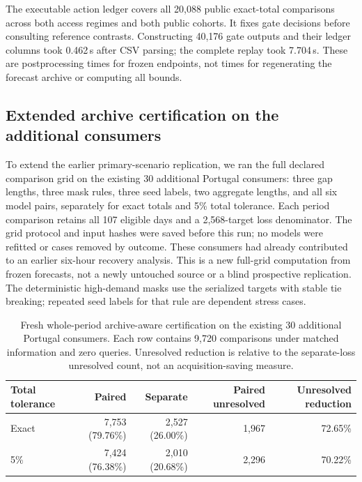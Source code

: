 The executable action ledger covers all 20,088 public exact-total comparisons
across both access regimes and both public cohorts. It fixes gate decisions
before consulting reference contrasts. Constructing 40,176 gate outputs and
their ledger columns took 0.462\,s after CSV parsing; the complete replay took
7.704\,s. These are postprocessing times for frozen endpoints, not times for
regenerating the forecast archive or computing all bounds.

\subsection{Extended archive certification on the additional consumers}
\label{sec:extended_archive_replication}
To extend the earlier primary-scenario replication, we ran the full declared
comparison grid on the existing 30 additional Portugal consumers: three gap
lengths, three mask rules, three seed labels, two aggregate lengths, and all
six model pairs, separately for exact totals and 5\% total tolerance.
Each period comparison retains all 107 eligible days and a 2,568-target loss
denominator. The grid protocol and input hashes were saved before this run;
no models were refitted or cases removed by outcome. These consumers had
already contributed to an earlier six-hour recovery analysis. This is a new
full-grid computation from frozen forecasts, not a newly untouched source
or a blind prospective replication. The deterministic high-demand masks use
the serialized targets with stable tie breaking; repeated seed labels for
that rule are dependent stress cases.

\begin{table}[t]
\centering
\caption{Fresh whole-period archive-aware certification on the existing
30 additional Portugal consumers. Each row contains 9,720 comparisons under
matched information and zero queries. Unresolved reduction is relative to
the separate-loss unresolved count, not an acquisition-saving measure.}
\label{tab:extended_archive_replication}
\small\setlength{\tabcolsep}{4pt}
\begin{tabular}{lrrrr}
\toprule
Total tolerance & Paired & Separate & Paired unresolved & Unresolved reduction\\
\midrule
Exact & 7,753 (79.76\%) & 2,527 (26.00\%) & 1,967 & 72.65\%\\
5\% & 7,424 (76.38\%) & 2,010 (20.68\%) & 2,296 & 70.22\%\\
\bottomrule
\end{tabular}
\end{table}

